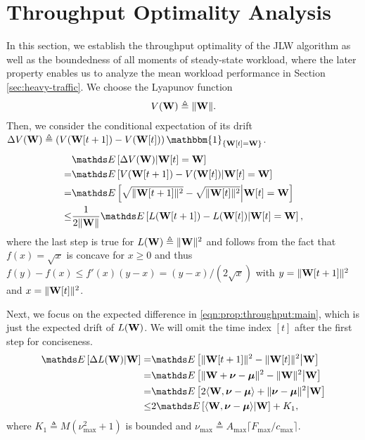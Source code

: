\documentclass[10pt, conference, letterpaper]{IEEEtran} %
\begin{document}
\section{Throughput Optimality Analysis}




\label{sec:throughput:optimality}

In this section, we establish the throughput optimality of the JLW algorithm as well as the boundedness of all moments of steady-state workload, where the later property enables us to analyze the mean workload performance in Section \ref{sec:heavy-traffic}. We choose the Lyapunov function 
\begin{align}
V(\mathbf{W})\triangleq\|\mathbf{W}\|.
\end{align}
Then, we consider the conditional expectation of its drift $\Delta V(\mb{W})\triangleq \left(V(\mb{W}[t+1])-V(\mb{W}[t])\right)\mathbbm{1}_{\{\mb{W}[t]=\mb{W}\}}$.
\begin{align}
\label{eqn:prop:throughput:main}
&\bE\left[\Delta V(\mb{W})\middle|\mb{W}[t]=\mb{W}\right]\nonumber\\
=&\bE\left[V(\mb{W}[t+1])-V(\mb{W}[t])\middle|\mb{W}[t]=\mb{W}\right]\nonumber\\
=&\bE\left[\sqrt{\|\mb{W}[t+1]\|^2}-\sqrt{\|\mb{W}[t]\|^2}\middle|\mb{W}[t]=\mb{W}\right]\nonumber\\
\leq&\frac{1}{2\|\mb{W}\|}\bE\left[L(\mb{W}[t+1])-L(\mb{W}[t])\middle|\mb{W}[t]=\mb{W}\right],
\end{align}
where the last step is true for $L(\mathbf{W})\triangleq\|\mathbf{W}\|^2$ and follows from the fact that $f(x)=\sqrt{x}$ is concave for $x\geq0$ and thus $f(y)-f(x)\leq f'(x)(y-x)=(y-x)/(2\sqrt{x})$ with $y=\|\mathbf{W}[t+1]\|^2$ and $x=\|\mathbf{W}[t]\|^2$.

Next, we focus on the expected difference in \eqref{eqn:prop:throughput:main}, which is just the expected drift of $L(\mathbf{W})$. We will omit the time index $[t]$ after the first step for conciseness. 
\begin{align}
\label{eqn:prop:throughput:quadractic}
\bE\left[\Delta L(\mb{W})\middle|\mb{W}\right]=&\bE\left[\|\mb{W}[t+1]\|^2-\|\mb{W}[t]\|^2\middle|\mb{W}\right] \nonumber\\
=&\bE\left[\|\mb{W}+\bs{\nu}-\bs{\mu}\|^2-\|\mb{W}\|^2\middle|\mb{W}\right]\nonumber\\
=&\bE\left[2\langle \mb{W}, \bs{\nu}-\bs{\mu}\rangle + \|\bs{\nu}-\bs{\mu}\|^2\middle|\mb{W}\right] \nonumber\\
\leq&2\bE\left[\langle\mb{W},\bs{\nu}-\bs{\mu}\rangle\middle|\mb{W}\right] + K_1,
\end{align}
where $K_1\triangleq M(\nu_{\max}^2+1)$ is bounded and $\nu_{\max}\triangleq A_{\max}\lceil F_{\max}/c_{\max}\rceil$.
\end{document}
